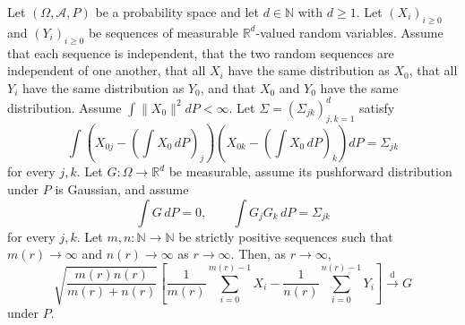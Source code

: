 \begin{theorem}
Let $(\Omega,\mathcal A,P)$ be a probability space and let
$d\in\mathbb N$ with $d\ge1$.  Let
$(X_i)_{i\ge0}$ and $(Y_i)_{i\ge0}$ be sequences of measurable
$\mathbb R^d$-valued random variables.  Assume that each sequence is
independent, that the two random sequences are independent of one another,
that all $X_i$ have the same distribution as $X_0$, that all $Y_i$ have the
same distribution as $Y_0$, and that $X_0$ and $Y_0$ have the same
distribution.  Assume $\int\|X_0\|^2dP<\infty$.  Let
$\Sigma=(\Sigma_{jk})_{j,k=1}^d$ satisfy
\[
 \int
 \left(X_{0j}-\left(\int X_0\,dP\right)_j\right)
 \left(X_{0k}-\left(\int X_0\,dP\right)_k\right)dP
 =\Sigma_{jk}
\]
for every $j,k$.  Let $G:\Omega\to\mathbb R^d$ be measurable, assume its
pushforward distribution under $P$ is Gaussian, and assume
\[
 \int G\,dP=0,\qquad
 \int G_jG_k\,dP=\Sigma_{jk}
\]
for every $j,k$.  Let $m,n:\mathbb N\to\mathbb N$ be strictly positive
sequences such that $m(r)\to\infty$ and $n(r)\to\infty$ as
$r\to\infty$.  Then, as $r\to\infty$,
\[
 \sqrt{\frac{m(r)n(r)}{m(r)+n(r)}}\left[
 \frac1{m(r)}\sum_{i=0}^{m(r)-1}X_i
 -
 \frac1{n(r)}\sum_{i=0}^{n(r)-1}Y_i
 \right]
 \xrightarrow{\mathrm d}G
\]
under $P$.
\end{theorem}
